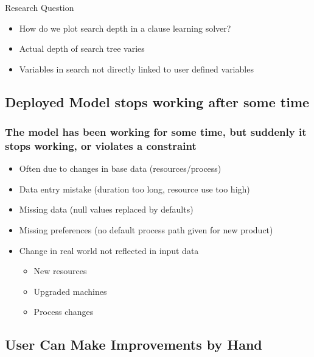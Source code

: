 \begin{frame}{Research Question}
    \begin{itemize}
        \item How do we plot search depth in a clause learning solver?
        \item Actual depth of search tree varies 
        \item Variables in search not directly linked to user defined variables
    \end{itemize}
\end{frame}



\subsection*{Deployed Model stops working after some time}

\begin{frame}
\frametitle{The model has been working for some time, but suddenly it stops working, or violates a constraint}
\begin{itemize}
\item Often due to changes in base data (resources/process)
\item Data entry mistake (duration too long,  resource use too high)
\item Missing data (null values replaced by defaults)
  \item Missing preferences (no default process path given for new product)
\item Change in real world not reflected in input data
  \begin{itemize}
  \item New resources
  \item Upgraded machines
    \item Process changes
\end{itemize}
\end{itemize}
\end{frame}

\subsection*{User Can Make Improvements by Hand}

